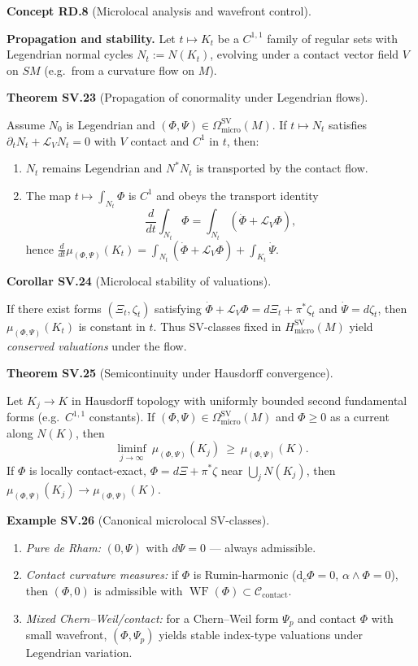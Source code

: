 \documentclass[10pt, letterpaper]{article}
\DeclareMathOperator{\WF}{WF}
\newcommand{\CustomHeading}[3]{%
  \par\medskip\noindent%
  \textbf{#1 #2} \textnormal{(#3)}.\enskip%
}
\newenvironment{THEO}[2]{\begin{unitbox}\CustomHeading{Theorem}{#1}{#2}}{\end{unitbox}}
\newenvironment{KORO}[2]{\begin{unitbox}\CustomHeading{Corollar}{#1}{#2}}{\end{unitbox}}
\newenvironment{EXA}[2]{\begin{unitbox}\CustomHeading{Example}{#1}{#2}}{\end{unitbox}}
\newenvironment{CONC}[2]{\begin{unitbox}\CustomHeading{Concept}{#1}{#2}}{\end{unitbox}}
\begin{document}
\begin{CONC}{RD.8}{Microlocal analysis and wavefront control}
\medskip\noindent\textbf{Propagation and stability.}
Let $t\mapsto K_t$ be a $C^{1,1}$ family of regular sets with Legendrian normal cycles $N_t:=N(K_t)$,
evolving under a contact vector field $V$ on $SM$ (e.g.\ from a curvature flow on $M$).

\begin{THEO}{SV.23}{Propagation of conormality under Legendrian flows}
Assume $N_0$ is Legendrian and $(\Phi,\Psi)\in\Omega^{\operatorname{SV}}_{\mathrm{micro}}(M)$.
If $t\mapsto N_t$ satisfies $\partial_t N_t+\mathcal L_V N_t=0$ with $V$ contact and $C^1$ in $t$, then:
\begin{enumerate}[label=(\alph*)]
\item $N_t$ remains Legendrian and $N^*N_t$ is transported by the contact flow.
\item The map $t\mapsto \int_{N_t}\Phi$ is $C^1$ and obeys the transport identity
\[
\frac{d}{dt}\int_{N_t}\Phi=\int_{N_t}(\dot\Phi+\mathcal L_V\Phi),
\]
hence
$\displaystyle \frac{d}{dt}\mu_{(\Phi,\Psi)}(K_t)
=\int_{N_t}(\dot\Phi+\mathcal L_V\Phi)+\int_{K_t}\dot\Psi$.
\end{enumerate}
\end{THEO}

\begin{KORO}{SV.24}{Microlocal stability of valuations}
If there exist forms $(\Xi_t,\zeta_t)$ satisfying
$\dot\Phi+\mathcal L_V\Phi=d\Xi_t+\pi^*\zeta_t$ and $\dot\Psi=d\zeta_t$,
then $\mu_{(\Phi,\Psi)}(K_t)$ is constant in $t$.
Thus SV-classes fixed in $H^{\operatorname{SV}}_{\mathrm{micro}}(M)$
yield \emph{conserved valuations} under the flow.
\end{KORO}

\begin{THEO}{SV.25}{Semicontinuity under Hausdorff convergence}
Let $K_j\to K$ in Hausdorff topology with uniformly bounded second fundamental forms (e.g.\ $C^{1,1}$ constants).
If $(\Phi,\Psi)\in\Omega^{\operatorname{SV}}_{\mathrm{micro}}(M)$ and $\Phi\ge0$ as a current along $N(K)$, then
\[
\liminf_{j\to\infty}\ \mu_{(\Phi,\Psi)}(K_j)\ \ge\ \mu_{(\Phi,\Psi)}(K).
\]
If $\Phi$ is locally contact-exact, $\Phi=d\Xi+\pi^*\zeta$ near $\bigcup_j N(K_j)$,
then $\mu_{(\Phi,\Psi)}(K_j)\to\mu_{(\Phi,\Psi)}(K)$.
\end{THEO}

\begin{EXA}{SV.26}{Canonical microlocal SV-classes}
\begin{enumerate}[label=(1)]
\item \emph{Pure de Rham:} $(0,\Psi)$ with $d\Psi=0$ — always admissible.
\item \emph{Contact curvature measures:} if $\Phi$ is Rumin-harmonic ($\mathrm d_c\Phi=0$, $\alpha\wedge\Phi=0$),
then $(\Phi,0)$ is admissible with $\WF(\Phi)\subset\mathcal C_{\mathrm{contact}}$.
\item \emph{Mixed Chern–Weil/contact:} for a Chern–Weil form $\Psi_p$ and contact $\Phi$ with small wavefront,
$(\Phi,\Psi_p)$ yields stable index-type valuations under Legendrian variation.
\end{enumerate}
\end{EXA}


\end{CONC}
\end{document}
